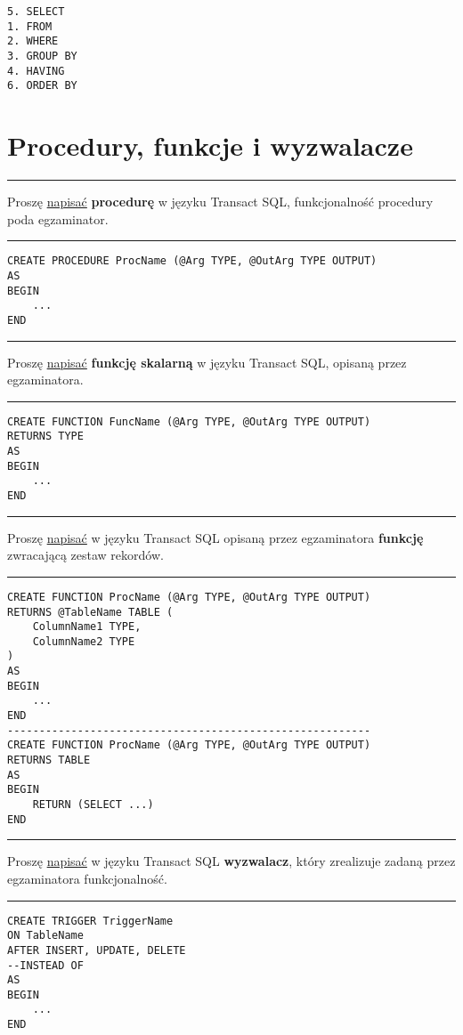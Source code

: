 \documentclass[a5paper,6pt]{article}
\newcommand{\horrule}[1]{\rule{\linewidth}{#1}}
\begin{document}
\begin{verbatim}
5. SELECT
1. FROM
2. WHERE
3. GROUP BY
4. HAVING
6. ORDER BY
\end{verbatim}


    \section{Procedury, funkcje i wyzwalacze} %
    \label{sec:procedury_funkcje_i_wyzwalacze}

    \horrule{0.5pt}
    Proszę \underline{napisać} \textbf{procedurę} w języku Transact SQL,
    funkcjonalność procedury poda egzaminator.\\
    \horrule{0.5pt}

\begin{verbatim}
CREATE PROCEDURE ProcName (@Arg TYPE, @OutArg TYPE OUTPUT)
AS
BEGIN
    ...
END
\end{verbatim}

    \horrule{0.5pt}
    Proszę \underline{napisać} \textbf{funkcję skalarną} w języku Transact SQL,
    opisaną przez egzaminatora.\\
    \horrule{0.5pt}

\begin{verbatim}
CREATE FUNCTION FuncName (@Arg TYPE, @OutArg TYPE OUTPUT)
RETURNS TYPE
AS
BEGIN
    ...
END
\end{verbatim}

    \horrule{0.5pt}
    Proszę \underline{napisać} w języku Transact SQL opisaną przez egzaminatora
    \textbf{funkcję} zwracającą zestaw rekordów.\\
    \horrule{0.5pt}

\begin{verbatim}
CREATE FUNCTION ProcName (@Arg TYPE, @OutArg TYPE OUTPUT)
RETURNS @TableName TABLE (
    ColumnName1 TYPE,
    ColumnName2 TYPE
)
AS
BEGIN
    ...
END
---------------------------------------------------------
CREATE FUNCTION ProcName (@Arg TYPE, @OutArg TYPE OUTPUT)
RETURNS TABLE
AS
BEGIN
    RETURN (SELECT ...)
END
\end{verbatim}

    \horrule{0.5pt}
    Proszę \underline{napisać} w języku Transact SQL \textbf{wyzwalacz}, który
    zrealizuje zadaną przez egzaminatora funkcjonalność.\\
    \horrule{0.5pt}

\begin{verbatim}
CREATE TRIGGER TriggerName
ON TableName
AFTER INSERT, UPDATE, DELETE
--INSTEAD OF
AS
BEGIN
    ...
END
\end{verbatim}
\end{document}
